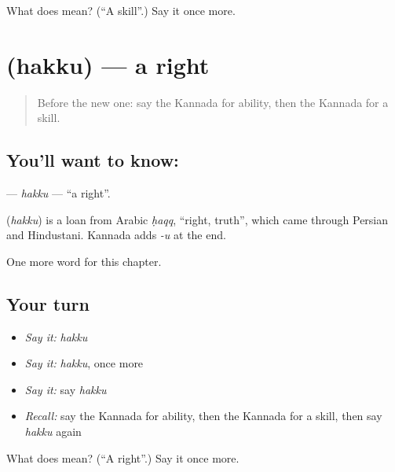 \begin{tcolorbox}[breakable,colback=teal!4,colframe=teal!35!black,title={Before you move on}]
What does  mean? (\textquotedblleft{}A skill\textquotedblright{}.) Say it once more.
\end{tcolorbox}
\section[\texorpdfstring{\kn{ಹಕ್ಕು} (hakku)}{ಹಕ್ಕು (hakku)}]{ (hakku) — a right}

\label{lesson:KA-C112-hakku}



\begin{quote}
Before the new one: say the Kannada for ability, then the Kannada for a skill.
\end{quote}

\subsection*{You'll want to know: }
\textbf{} — \emph{hakku} — \textquotedblleft{}a right\textquotedblright{}.

\begin{cousinweb}
\textbf{} (\emph{hakku}) is a loan from Arabic \emph{ḥaqq}, \textquotedblleft{}right, truth\textquotedblright{}, which came through Persian and Hindustani. Kannada adds \emph{-u} at the end.
\end{cousinweb}

\begin{grammarlens}[title={What you've built}]
One more word for this chapter.
\end{grammarlens}

\subsection*{Your turn}
\begin{itemize}
\raggedright
  \item \emph{Say it:} \emph{hakku}
  \item \emph{Say it:} \emph{hakku}, once more
  \item \emph{Say it:} say \emph{hakku}
  \item \emph{Recall:} say the Kannada for ability, then the Kannada for a skill, then say \emph{hakku} again
\end{itemize}

\begin{tcolorbox}[breakable,colback=teal!4,colframe=teal!35!black,title={Before you move on}]
What does  mean? (\textquotedblleft{}A right\textquotedblright{}.) Say it once more.
\end{tcolorbox}

